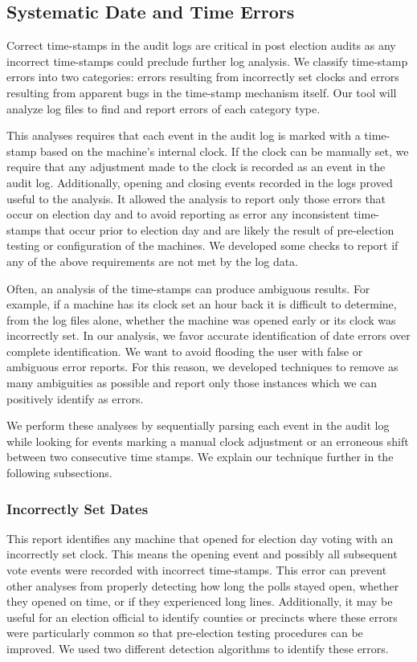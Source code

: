 \subsection{Systematic Date and Time Errors}\label{an:date} Correct
time-stamps in the audit logs
are critical in post election audits as any incorrect time-stamps
could preclude further log analysis. 
We classify time-stamp errors into two categories: errors
resulting from incorrectly set clocks and errors resulting from apparent bugs in
the time-stamp mechanism itself. Our tool will analyze log files to
find and report errors of each category type.

This analyses requires that each event in the audit log
is marked with a time-stamp based on the machine's internal clock. If
the clock can be manually set, we require that any adjustment made to
the clock is recorded as an event in the
audit log. Additionally, opening and closing events recorded in the logs proved
useful to the analysis. It allowed the analysis to report only those
errors that occur on election day and to avoid reporting as error
any inconsistent time-stamps that occur prior to election day and are
likely the result of pre-election testing or configuration of the
machines. We developed some checks to report if any of
the above requirements are not met by the log data.

Often, an analysis of the time-stamps can produce ambiguous
results. For example, if a machine has its clock set an hour back it
is difficult to determine, from the log files alone, whether the machine
was opened early or its clock was incorrectly set. In our analysis, we
favor accurate identification of date errors over complete
identification. We want to avoid flooding the user with false or
ambiguous error reports. For this reason, we developed techniques to
remove as many ambiguities as possible and report only those
instances which we can positively identify as errors.

We perform these analyses by sequentially parsing each event in the
audit log while looking for events marking a manual clock adjustment
or an erroneous shift between two consecutive time stamps. We explain
our technique further in the following subsections.

\subsubsection{Incorrectly Set Dates}
This report identifies any machine that opened for election day voting
with an incorrectly set clock.  This means the opening event and
possibly all subsequent vote events were recorded with incorrect
time-stamps. This error can prevent other analyses
from properly detecting how long the polls stayed open, whether they opened on
time, or if they experienced long lines. Additionally, it may be useful for an
election official to identify counties or precincts where these errors were
particularly common so that pre-election testing procedures can be improved.
We used two different detection algorithms to identify these errors.

